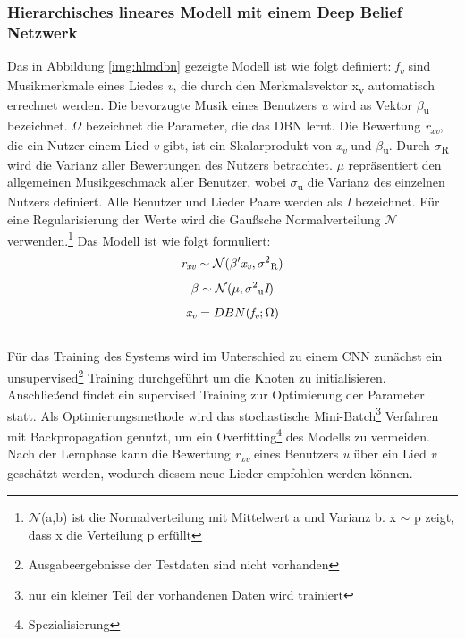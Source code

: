 \documentclass[twosided,a4,10pt]{article}
\begin{document}
\begin{multicols}{2}
		\subsubsection{Hierarchisches lineares Modell mit einem Deep Belief Netzwerk}
		Das in Abbildung \ref{img:hlmdbn} gezeigte Modell ist wie folgt definiert: \textit{f\textsubscript{v}} sind Musikmerkmale eines Liedes \textit{v}, die durch den Merkmalsvektor x\textsubscript{v} automatisch errechnet werden. Die bevorzugte Musik eines Benutzers \textit{u} wird as Vektor $\beta$\textsubscript{u} bezeichnet. $\Omega$ bezeichnet die Parameter, die das DBN lernt. Die Bewertung \textit{r\textsubscript{xv}}, die ein Nutzer einem Lied \textit{v} gibt, ist ein Skalarprodukt von \textit{x\textsubscript{v}} und $\beta$\textsubscript{u}. Durch $\sigma$\textsubscript{R} wird die Varianz aller Bewertungen des Nutzers betrachtet. $\mu$ repräsentiert den allgemeinen Musikgeschmack aller Benutzer, wobei $\sigma$\textsubscript{u} die Varianz des einzelnen Nutzers definiert. Alle Benutzer und Lieder Paare werden als \textit{I} bezeichnet. Für eine Regularisierung der Werte wird die Gaußsche Normalverteilung $\mathcal{N}$ verwenden.\footnote[16]{$\mathcal{N}$(a,b) ist die Normalverteilung mit Mittelwert a und Varianz b. x $\sim$ p zeigt, dass x die Verteilung p erfüllt} \cite{wang}\newline Das Modell ist wie folgt formuliert:\newline
		\begin{equation*}
			\centering
			\textit{r\textsubscript{xv}}\sim\mathcal{N}(\beta'\textit{x\textsubscript{v}},\sigma\textsuperscript{2}\textsubscript{R})
		\end{equation*}
		\begin{equation*}
		\centering
			\beta\sim\mathcal{N}(\mu,\sigma\textsuperscript{2}\textsubscript{u}\textit{I})
		\end{equation*}
		\begin{equation*}
			\textit{x\textsubscript{v}} = DBN(\textit{f\textsubscript{v}};\Omega)
		\end{equation*}\newline\\
		Für das Training des Systems wird im Unterschied zu einem CNN zunächst ein unsupervised\footnote[17]{Ausgabeergebnisse der Testdaten sind nicht vorhanden} Training durchgeführt um die Knoten zu initialisieren. Anschließend findet ein supervised Training zur Optimierung der Parameter statt. Als Optimierungsmethode wird das stochastische Mini-Batch\footnote[18]{nur ein kleiner Teil der vorhandenen Daten wird trainiert} Verfahren mit Backpropagation genutzt, um ein Overfitting\footnote[19]{Spezialisierung} des Modells zu vermeiden. Nach der Lernphase kann die Bewertung \textit{r\textsubscript{xv}} eines Benutzers \textit{u} über ein Lied \textit{v} geschätzt werden, wodurch diesem neue Lieder empfohlen werden können. \cite{wang}

\end{multicols}
\end{document}
